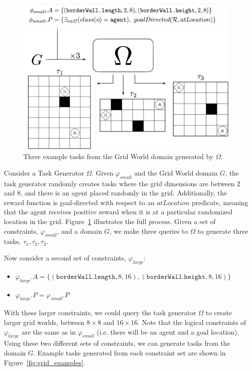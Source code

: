 \documentclass[11pt]{article}
\begin{document}
\begin{figure}
\centering
\includegraphics[width=0.65\linewidth]{figures/task_generator.png}
\caption{Three example tasks from the Grid World domain generated by $\Omega$.}
\label{fig:task_generator}
\end{figure}

Consider a Task Generator $\Omega$. Given $\varphi_{small}$ and the Grid World domain $G$, the task generator randomly creates tasks where the grid dimensions are between 2 and 8, and there is an agent placed randomly in the grid. Additionally, the reward function is goal-directed with respect to an $atLocation$ predicate, meaning that the agent receives positive reward when it is at a particular randomized location in the grid. Figure~\ref{fig:task_generator} illustrates the full process. Given a set of constraints, $\varphi_{small}$, and a domain $G$, we make three queries to $\Omega$ to generate three tasks, $\tau_1, \tau_2, \tau_3$.


Now consider a second set of constraints, $\varphi_{large}$:
\begin{itemize}
\item $\varphi_{large}.A = \{ (\texttt{borderWall.length}, 8, 16), (\texttt{borderWall.height}, 8, 16) \}$
\item $\varphi_{large}.P = \varphi_{small}.P$
\end{itemize}

With these larger constraints, we could query the task generator $\Omega$ to create larger grid worlds, between $8 \times 8$ and $16\times16$. Note that the logical constraints of $\varphi_{large}$ are the same as in $\varphi_{small}$ (i.e. there will be an agent and a goal location). Using these two different sets of constraints, we can generate tasks from the domain $G$. Example tasks generated from each constraint set are shown in Figure~\ref{fig:grid_examples}.
\end{document}
